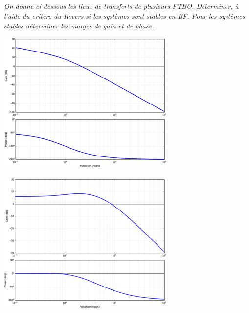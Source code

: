 \documentclass[10pt,fleqn]{article} %
\begin{document}

\vspace{4cm}
\pagestyle{fancy}
\thispagestyle{plain}

\def\columnseprulecolor{\color{ocre}}
\setlength{\columnseprule}{0.4pt} 

\def\pathfig{images}

\begin{multicols}{2}

\subparagraph{}\textit{On donne ci-dessous les lieux de transferts de plusieurs  FTBO. Déterminer, à l’aide du critère du Revers si les systèmes sont stables en BF. Pour les systèmes stables déterminer les marges de gain et de phase.}
 
 
\begin{center}
\includegraphics[width=\linewidth]{images/im_01}
\end{center}

\begin{center}
\includegraphics[width=\linewidth]{images/im_02}
\end{center}


\end{multicols}
\end{document}
